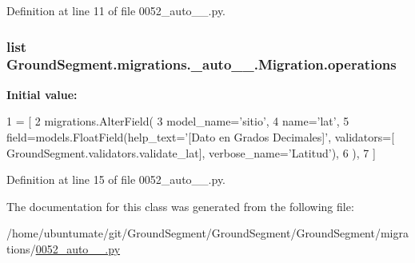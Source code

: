 Definition at line 11 of file 0052\+\_\+auto\+\_\+\_.\+py.

\hypertarget{class_ground_segment_1_1migrations_1_10052__auto__20170324__2213_1_1_migration_a7dce325482e5bfb146dc4bcfebd76b67}{}
\subsubsection[{operations}]{\setlength{\rightskip}{0pt plus 5cm}list Ground\+Segment.\+migrations.\+\_\+auto\+\_\+\_.\+Migration.\+operations\hspace{0.3cm}{\ttfamily [static]}}\label{class_ground_segment_1_1migrations_1_10052__auto__20170324__2213_1_1_migration_a7dce325482e5bfb146dc4bcfebd76b67}
{\bfseries Initial value\+:}
\begin{DoxyCode}
1 = [
2         migrations.AlterField(
3             model\_name=\textcolor{stringliteral}{'sitio'},
4             name=\textcolor{stringliteral}{'lat'},
5             field=models.FloatField(help\_text=\textcolor{stringliteral}{'[Dato en Grados Decimales]'}, validators=[
      GroundSegment.validators.validate\_lat], verbose\_name=\textcolor{stringliteral}{'Latitud'}),
6         ),
7     ]
\end{DoxyCode}


Definition at line 15 of file 0052\+\_\+auto\+\_\+\_.\+py.



The documentation for this class was generated from the following file\+:\begin{DoxyCompactItemize}
\item 
/home/ubuntumate/git/\+Ground\+Segment/\+Ground\+Segment/\+Ground\+Segment/migrations/\hyperlink{0052__auto__20170324__2213_8py}{0052\+\_\+auto\+\_\+\_.\+py}\end{DoxyCompactItemize}
